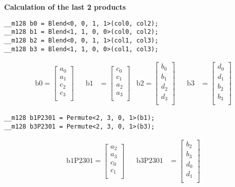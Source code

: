\documentclass[fontsize = 10pt,DIV = 13]{scrartcl}
\begin{document}
\vspace{1cm}
\textbf{Calculation of the last 2 products}
\vspace{1cm}

\begin{verbatim}
__m128 b0 = Blend<0, 0, 1, 1>(col0, col2);
__m128 b1 = Blend<1, 1, 0, 0>(col0, col2);
__m128 b2 = Blend<0, 0, 1, 1>(col1, col3);
__m128 b3 = Blend<1, 1, 0, 0>(col1, col3);
\end{verbatim}

\begin{align*}
\mathrm{b0} 
=
\begin{bmatrix}
a_0\\
a_1\\
c_2\\
c_3\\
\end{bmatrix}
&&
\mathrm{b1} 
&=
\begin{bmatrix}
c_0\\
c_1\\
a_2\\
a_3\\
\end{bmatrix}
&
\mathrm{b2} 
=
\begin{bmatrix}
b_0\\
b_1\\
d_2\\
d_3\\
\end{bmatrix}
&&
\mathrm{b3} 
&=
\begin{bmatrix}
d_0\\
d_1\\
b_2\\
b_3\\
\end{bmatrix}
\end{align*}

\begin{verbatim}
__m128 b1P2301 = Permute<2, 3, 0, 1>(b1);
__m128 b3P2301 = Permute<2, 3, 0, 1>(b3);
\end{verbatim}

\begin{align*}
\mathrm{b1P2301} 
=
\begin{bmatrix}
a_2\\
a_3\\
c_0\\
c_1\\
\end{bmatrix}
&&
\mathrm{b3P2301} 
&=
\begin{bmatrix}
b_2\\
b_3\\
d_0\\
d_1\\
\end{bmatrix}
\end{align*}
\end{document}
